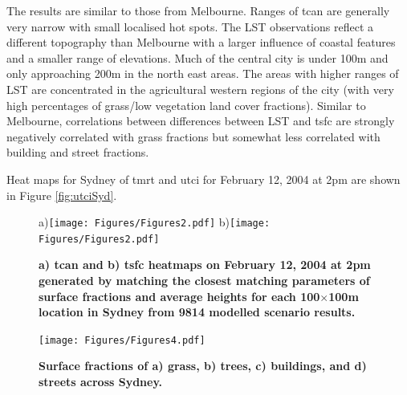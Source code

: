 \documentclass[final,3p,times,authoryear]{elsarticle}
\begin{document}
The results are similar to those from Melbourne. Ranges of \gls{tcan} are generally very narrow with small localised hot spots. The LST observations reflect a different topography than Melbourne with a larger influence of coastal features and a smaller range of elevations. Much of the central city is under 100m and only approaching 200m in the north east areas. The areas with higher ranges of LST are concentrated in the agricultural western regions of the city (with very high percentages of grass/low vegetation land cover fractions). Similar to Melbourne, correlations between differences between LST and \gls{tsfc} are strongly negatively correlated with grass fractions but somewhat less correlated with building and street fractions.


Heat maps for Sydney of \gls{tmrt} and \gls{utci} for February 12, 2004 at 2pm are shown in Figure \ref{fig:utciSyd}.

\begin{figure}
\centering
a)\texttt{[image: Figures/Figures2.pdf]}
b)\texttt{[image: Figures/Figures2.pdf]}
\caption{\bf a) \gls{tcan} and b) \gls{tsfc} heatmaps on February 12, 2004 at 2pm generated by matching the closest matching parameters of surface fractions and average heights for each 100$\times$100m location in Sydney from 9814 modelled scenario results.  }
 \label{fig:TaSyd}
\end{figure}

\begin{figure}
\centering
\texttt{[image: Figures/Figures4.pdf]}
\caption{\bf Surface fractions of a) grass, b) trees, c) buildings, and d) streets across Sydney.}
 \label{fig:sydfracs}
\end{figure}
\end{document}
